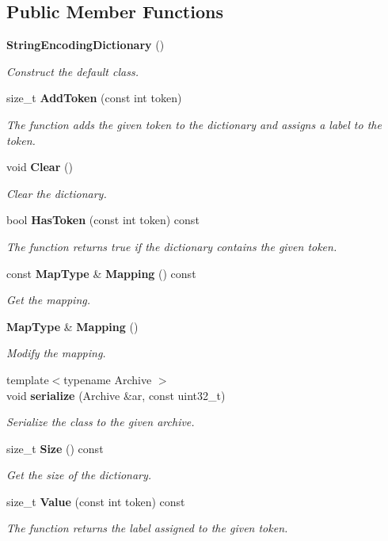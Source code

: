 \subsection*{Public Member Functions}
\begin{DoxyCompactItemize}
\item 
\textbf{ String\+Encoding\+Dictionary} ()
\begin{DoxyCompactList}\small\item\em Construct the default class. \end{DoxyCompactList}\item 
size\+\_\+t \textbf{ Add\+Token} (const int token)
\begin{DoxyCompactList}\small\item\em The function adds the given token to the dictionary and assigns a label to the token. \end{DoxyCompactList}\item 
void \textbf{ Clear} ()
\begin{DoxyCompactList}\small\item\em Clear the dictionary. \end{DoxyCompactList}\item 
bool \textbf{ Has\+Token} (const int token) const
\begin{DoxyCompactList}\small\item\em The function returns true if the dictionary contains the given token. \end{DoxyCompactList}\item 
const \textbf{ Map\+Type} \& \textbf{ Mapping} () const
\begin{DoxyCompactList}\small\item\em Get the mapping. \end{DoxyCompactList}\item 
\textbf{ Map\+Type} \& \textbf{ Mapping} ()
\begin{DoxyCompactList}\small\item\em Modify the mapping. \end{DoxyCompactList}\item 
{\footnotesize template$<$typename Archive $>$ }\\void \textbf{ serialize} (Archive \&ar, const uint32\+\_\+t)
\begin{DoxyCompactList}\small\item\em Serialize the class to the given archive. \end{DoxyCompactList}\item 
size\+\_\+t \textbf{ Size} () const
\begin{DoxyCompactList}\small\item\em Get the size of the dictionary. \end{DoxyCompactList}\item 
size\+\_\+t \textbf{ Value} (const int token) const
\begin{DoxyCompactList}\small\item\em The function returns the label assigned to the given token. \end{DoxyCompactList}\end{DoxyCompactItemize}


